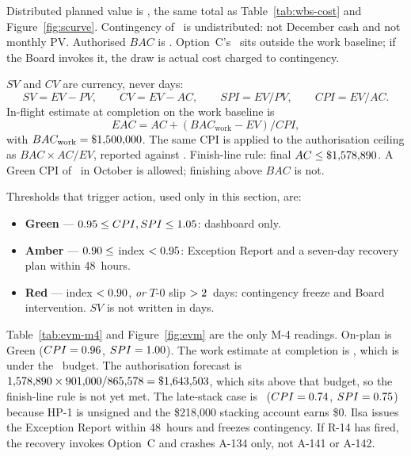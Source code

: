 Distributed planned value is \PEPbase, the same total as Table~\ref{tab:wbs-cost} and Figure~\ref{fig:scurve}. Contingency of \PEPcontingency\ is undistributed: not December cash and not monthly PV. Authorised $BAC$ is \PEPbac. Option~C's \PEPoptionC\ sits outside the work baseline; if the Board invokes it, the draw is actual cost charged to contingency.

$SV$ and $CV$ are currency, never days:
\begin{equation}
SV = EV - PV, \qquad CV = EV - AC, \qquad SPI = EV/PV, \qquad CPI = EV/AC.
\label{eq:evm}
\end{equation}
In-flight estimate at completion on the work baseline is
\begin{equation}
EAC = AC + (BAC_{\text{work}} - EV)/CPI,
\label{eq:eac}
\end{equation}
with $BAC_{\text{work}} = \$1{,}500{,}000$. The same CPI is applied to the authorisation ceiling as $BAC \times AC / EV$, reported against \PEPbac \citep{pmi2019evm}. Finish-line rule: final $AC \le \$1{,}578{,}890$. A Green CPI of \PEPonPlanCPI\ in October is allowed; finishing above $BAC$ is not.

Thresholds that trigger action, used only in this section, are:

\begin{itemize}[leftmargin=1.4em,itemsep=0.25em]
\item \textbf{Green} --- $0.95 \le CPI,SPI \le 1.05$: dashboard only.
\item \textbf{Amber} --- $0.90 \le$ index $< 0.95$: Exception Report and a seven-day recovery plan within 48~hours.
\item \textbf{Red} --- index $< 0.90$, \emph{or} $T$-0 slip $> 2$~days: contingency freeze and Board intervention. $SV$ is not written in days.
\end{itemize}

Table~\ref{tab:evm-m4} and Figure~\ref{fig:evm} are the only M-4 readings. On-plan is Green ($CPI = 0.96$, $SPI = 1.00$). The work estimate at completion is \PEPonPlanEac, which is under the \PEPbac\ budget. The authorisation forecast is $1{,}578{,}890 \times 901{,}000 / 865{,}578 = \$1{,}643{,}503$, which sits above that budget, so the finish-line rule is not yet met. The late-stack case is \PEPlateBand\ ($CPI = 0.74$, $SPI = 0.75$) because HP-1 is unsigned and the \$218{,}000 stacking account earns \$0. Ilsa issues the Exception Report within 48~hours and freezes contingency. If R-14 has fired, the recovery invokes Option~C and crashes A-134 only, not A-141 or A-142.

